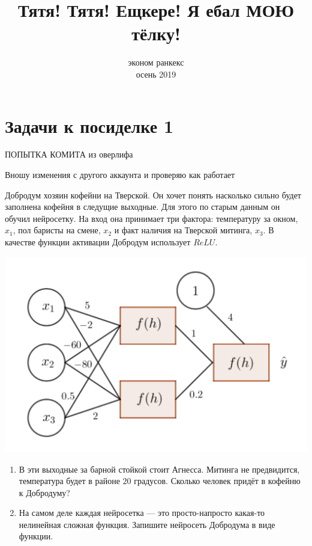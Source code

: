 \documentclass[12pt, a4paper, oneside]{article}
\title{Тятя! Тятя! Ещкере! Я ебал МОЮ тёлку!}
\date{эконом ранкекс \\ осень 2019}
\author{ }
\newcounter{problem}
\renewcommand{\theproblem}{\arabic{problem}}
\newcommand{\problemname}{Задача}
\newenvironment{problem}{
	\addtocounter{problem}{1}\noindent{ \color{myblue} \large\bfseries \problemname{} \theproblem \newline }
}{
	\par\bigskip
}
\begin{document}
	
	\maketitle
	
\section*{Задачи к посиделке 1} 


ПОПЫТКА КОМИТА из оверлифа

Вношу изменения с другого аккаунта и проверяю как работает 

\begin{problem}
Добродум хозяин кофейни на Тверской. Он хочет понять насколько сильно будет заполнена кофейня в следущие выходные. Для этого по старым данным он обучил нейросетку. На вход она принимает три фактора: температуру за окном, $x_1$, пол баристы на смене, $x_2$ и факт наличия на Тверской митинга, $x_3$.  В качестве функции активации Добродум использует $ReLU.$ 

\begin{center}
	\includegraphics[scale=0.2]{task_1.png}
\end{center}

\begin{enumerate}
\item В эти выходные за барной стойкой стоит Агнесса. Митинга не предвидится, температура будет в районе $20$ градусов. Сколько человек придёт в кофейню к Добродуму? 

\item На самом деле каждая нейросетка --- это просто-напросто какая-то нелинейная сложная функция. Запишите нейросеть Добродума в виде функции.
\end{enumerate}
\end{problem}
\end{document}
